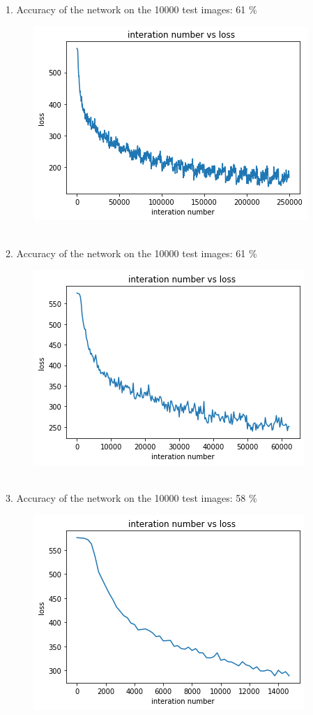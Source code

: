 \documentclass[answers]{exam}
\begin{document}
\begin{solution}
\\
1. Accuracy of the network on the 10000 test images: 61 \%
\begin{figure}[H]
    \centering
    \includegraphics[width=0.9\linewidth]{Images/gpu0.png}
\end{figure}
\\
2. Accuracy of the network on the 10000 test images: 61 \%
\begin{figure}[H]
    \centering
    \includegraphics[width=0.9\linewidth]{Images/gpu2.png}
\end{figure}
\\
3. Accuracy of the network on the 10000 test images: 58 \%
\begin{figure}[H]
    \centering
    \includegraphics[width=0.9\linewidth]{Images/gpu3.png}

\end{figure}
\end{solution}
\end{document}
